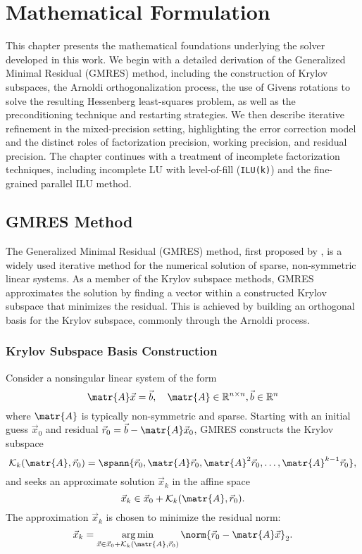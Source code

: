 \chapter{Mathematical Formulation}
\label{cha:math-form}

This chapter presents the mathematical foundations underlying the solver
developed in this work. We begin with a detailed derivation of the Generalized
Minimal Residual (GMRES) method, including the construction of Krylov subspaces,
the Arnoldi orthogonalization process, the use of Givens rotations to solve the
resulting Hessenberg least-squares problem, as well as the preconditioning
technique and restarting strategies. We then describe iterative refinement in
the mixed-precision setting, highlighting the error correction model and the
distinct roles of factorization precision, working precision, and residual
precision. The chapter continues with a treatment of incomplete factorization
techniques, including incomplete LU with level-of-fill (\texttt{ILU(k)}) and the
fine-grained parallel ILU method.

\section{GMRES Method}
\label{sec:gmres-algorithm}

The Generalized Minimal Residual (GMRES) method, first proposed by
\textcite{saad_gmres_1986}, is a widely used iterative method for the numerical
solution of sparse, non-symmetric linear systems. As a member of the Krylov
subspace methods, GMRES approximates the solution by finding a vector within a
constructed Krylov subspace that minimizes the residual. This is achieved by
building an orthogonal basis for the Krylov subspace, commonly through the
Arnoldi process.

\subsection{Krylov Subspace Basis Construction}
\label{sec:kryl-subsp-basis}

Consider a nonsingular linear system of the form
\begin{equation}
  \label{eq:axb}
  \matr{A} \vec{x} = \vec{b}, \quad \matr{A} \in \mathbb{R}^{n \times n}, \vec{b} \in \mathbb{R}^n
\end{equation}
where \(\matr{A}\) is typically non-symmetric and sparse. Starting with an
initial guess \(\vec{x}_0\) and residual \(\vec{r}_0 = \vec{b} - \matr{A}
\vec{x}_0\), GMRES constructs the Krylov subspace
\begin{equation}
  \label{eq:krylov}
  \mathcal{K}_k(\matr{A}, \vec{r}_0) = \spann{\vec{r}_0, \matr{A}\vec{r}_0, \matr{A}^2\vec{r}_0, \dots, \matr{A}^{k - 1}\vec{r}_0},
\end{equation}
and seeks an approximate solution \(\vec{x}_k\) in the affine space \[\vec{x}_k
  \in \vec{x}_0 + \mathcal{K}_k(\matr{A}, \vec{r}_0).\] The approximation
\(\vec{x}_k\) is chosen to minimize the residual norm:
\begin{equation}
  \label{eq:argmin}
  \vec{x}_k = \argmin_{\vec{x} \in \vec{x}_0 + \mathcal{K}_k(\matr{A}, \vec{r}_0)} \norm{\vec{r}_0 - \matr{A} \vec{x}}_2.
\end{equation}

